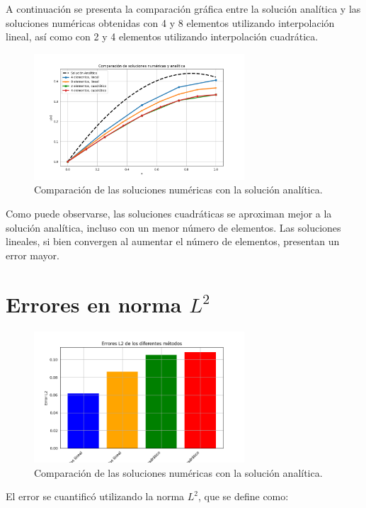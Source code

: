 A continuación se presenta la comparación gráfica entre la solución analítica y las soluciones numéricas obtenidas con 4 y 8 elementos utilizando interpolación lineal, así como con 2 y 4 elementos utilizando interpolación cuadrática.

\begin{figure}[H]
\centering
\includegraphics[width=0.7\textwidth]{figuras/galerkin_comparacion.png}
\caption{Comparación de las soluciones numéricas con la solución analítica.}
\end{figure}

Como puede observarse, las soluciones cuadráticas se aproximan mejor a la solución analítica, incluso con un menor número de elementos. Las soluciones lineales, si bien convergen al aumentar el número de elementos, presentan un error mayor.

\section{Errores en norma \(L^2\)}

\begin{figure}[H]
    \centering
    \includegraphics[width=0.7\textwidth]{figuras/galerkin_l2.png}
    \caption{Comparación de las soluciones numéricas con la solución analítica.}
\end{figure}
    

El error se cuantificó utilizando la norma \( L^2 \), que se define como:

